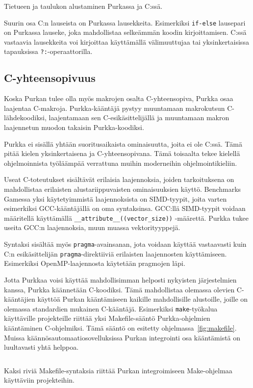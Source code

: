 \begin{listing}[ht!]
    \inputminted{Rust}{koodi/structinit.prk}
    \inputminted{C}{koodi/structinit.c}
    \caption{Tietueen ja taulukon alustaminen Purkassa ja C:ssä.}
    \label{fig:structinit}
\end{listing}

Suurin osa C:n lauseista on Purkassa lausekkeita. Esimerkiksi \texttt{if-else}
lausepari on Purkassa lauseke, joka mahdollistaa selkeämmän koodin
kirjoittamisen. C:ssä vastaavia lausekkeita voi kirjoittaa käyttämällä
välimuuttujaa tai yksinkertaisissa tapauksissa \texttt{?:}-operaattorilla.

\subsection{C-yhteensopivuus}

Koska Purkan tulee olla myös makrojen osalta C-yhteensopiva, Purkka osaa
laajentaa C-makroja. Purkka-kääntäjä pystyy muuntamaan makrokutsun
C-lähdekoodiksi, laajentamaan sen C-esikäsittelijällä ja muuntamaan makron
laajennetun muodon takaisin Purkka-koodiksi.


Purkka ei sisällä yhtään suoritusaikaista ominaisuutta, joita ei ole C:ssä.
Tämä pitää kielen yksinkertaisena ja C-yhteensopivana. Tämä toisaalta tekee
kielellä ohjelmoinnista työläämpää verrattuna muihin moderneihin
ohjelmointikieliin.

Useat C-toteutukset sisältävät erilaisia laajennoksia, joiden tarkoituksena on
mahdollistaa erilaisten alustariippuvaisten ominaisuuksien käyttö. Benchmarks
Gamessa yksi käytetyimmistä laajennoksista on SIMD-tyypit, joita varten
esimerkiksi GCC-kääntäjällä on oma syntaksinsa. GCC:llä SIMD-tyypit voidaan
määritellä käyttämällä \texttt{\_\_attribute\_\_((vector\_size))} -määrettä.
Purkka tukee useita GCC:n laajennoksia, muun muassa vektorityyppejä.

Syntaksi sisältää myös \texttt{pragma}-avainsanan, jota voidaan käyttää
vastaavasti kuin C:n esikäsittelijän \texttt{pragma}-direktiiviä erilaisten
laajennosten käyttämiseen. Esimerkiksi OpenMP-laajennosta käytetään pragmojen
läpi.

Jotta Purkkaa voisi käyttää mahdollisimman helposti nykyisten järjestelmien
kanssa, Purkka käännetään C-koodiksi. Tämä mahdollistaa olemassa olevien
C-kääntäjien käyttöä Purkan kääntämiseen kaikille mahdollisille alustoille,
joille on olemassa standardien mukainen C-kääntäjä. Esimerkiksi
\texttt{make}-työkalua käyttäville projekteille riittää yksi Makefile-sääntö
Purkka-ohjelmien kääntäminen C-ohjelmiksi. Tämä sääntö on esitetty
ohjelmassa~\ref{fig:makefile}. Muissa käännösautomaatiosovelluksissa Purkan
integrointi osa kääntämistä on luultavasti yhtä helppoa.

\begin{listing}[ht!]
    \inputminted{Makefile}{koodi/Makefile.kieli}
    \caption{Kaksi riviä Makefile-syntaksia riittää Purkan integroimiseen
    Make-ohjelmaa käyttäviin projekteihin.}
    \label{fig:makefile}
\end{listing}
